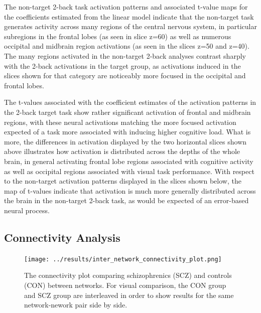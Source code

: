 \documentclass[11pt]{article}
\begin{document}
The non-target 2-back task activation patterns and associated t-value maps for the coefficients estimated from the linear model indicate that the non-target task generates activity across many regions of the central nervous system, in particular subregions in the frontal lobes (as seen in slice z=60) as well as numerous occipital and midbrain region activations (as seen in the slices z=50 and z=40). The many regions activated in the non-target 2-back analyses contrast sharply with the 2-back activations in the target group, as activations induced in the slices shown for that category are noticeably more focused in the occipital and frontal lobes.

The t-values associated with the coefficient estimates of the activation patterns in the 2-back target task show rather significant activation of frontal and midbrain regions, with these neural activations matching the more focused activation expected of a task more associated with inducing higher cognitive load. What is more, the differences in activation displayed by the two horizontal slices shown above illustrates how activation is distributed across the depths of the whole brain, in general activating frontal lobe regions associated with cognitive activity as well as occipital regions associated with visual task performance. With respect to the non-target activation patterns displayed in the slices shown below, the map of t-values indicate that activation is much more generally distributed across the brain in the non-target 2-back task, as would be expected of an error-based neural process.

\subsection{Connectivity Analysis}

\begin{figure}[H]
\centering
\texttt{[image: ../results/inter\_network\_connectivity\_plot.png]}
\caption{The connectivity plot comparing schizophrenics (SCZ) and controls (CON) between networks. For visual comparison, the CON group and SCZ group are interleaved in order to show results for the same network-nework pair side by side.}
\end{figure}
\end{document}
